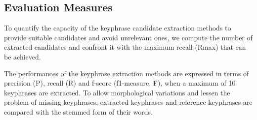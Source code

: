   \subsection{Evaluation Measures}
  \label{subsec:keyphrase_extraction_evaluation_measures}
    To quantify the capacity of the keyphrase candidate extraction methods to
    provide suitable candidates and avoid unrelevant ones, we compute the number
    of extracted candidates and confront it with the maximum recall (Rmax) that
    can be achieved.

    The performances of the keyphrase extraction methods are expressed in terms
    of precision (P), recall (R) and f-score (f1-measure, F), when a maximum of
    10 keyphrases are extracted. To allow morphological variations and lessen
    the problem of missing keyphrases, extracted keyphrases and reference
    keyphrases are compared with the stemmed form of their words.

